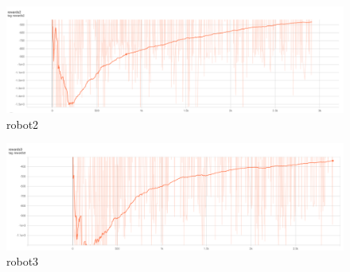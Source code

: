 \documentclass[12pt]{extarticle}
\begin{document}
\begin{figure}[h]  

\includegraphics[scale=0.35]{robot2}
\caption[robot2]{robot2}
\end{figure}

\begin{figure}[h]  

\includegraphics[scale=0.35]{robot3}
\caption[robot3]{robot3}
\end{figure}



 


\newpage


\end{document}
